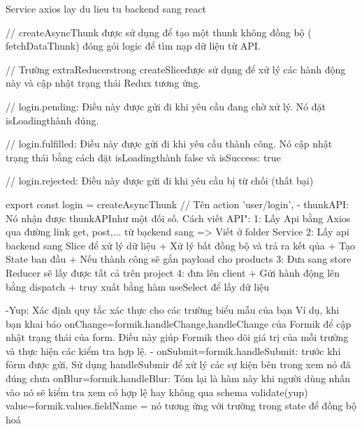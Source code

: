 Service axios lay du lieu tu backend sang react

// createAsyncThunk được sử dụng để tạo một thunk không đồng bộ ( fetchDataThunk) đóng gói logic để tìm nạp dữ liệu từ API.

// Trường extraReducerstrong createSliceđược sử dụng để xử lý các hành động này và cập nhật trạng thái Redux tương ứng.

// login.pending: Điều này được gửi đi khi yêu cầu  đang chờ xử lý. Nó đặt isLoadingthành đúng.

// login.fulfilled: Điều này được gửi đi khi yêu cầu thành công. Nó cập nhật trạng thái bằng cách đặt isLoadingthành false và isSuccess: true

// login.rejected: Điều này được gửi đi khi yêu cầu bị từ chối (thất bại)

export const login = createAsyncThunk
  // Tên action
  'user/login',
  - thunkAPI: Nó nhận được thunkAPInhư một đối số.
Cách viết API":
1: Lấy Api bằng Axios qua đường link get, post,... từ bạckend sang => Viết ở folder Service
2: Lấy api backend sang Slice để xử lý dữ liệu 
+ Xử lý bất đồng bộ và trả ra kết qủa
+ Tạo State ban đầu
+ Nếu thành công sẽ gắn payload cho products
3: Đưa sang store Reducer sẽ lấy được tất cả trên project
4: đưa lên client 
+ Gửi hành động lên bằng dispatch
+ truy xuất bằng hàm useSelect để lấy dữ liệu 

-Yup: Xác định quy tắc xác thực cho các trường biểu mẫu của bạn
Ví dụ, khi bạn khai báo onChange={formik.handleChange},handleChange của Formik để cập nhật trạng thái của form. 
Điều này giúp Formik theo dõi giá trị của mỗi trường và thực hiện các kiểm tra hợp lệ.
- onSubmit={formik.handleSubmit}: trước khi fỏrm được gửi, Sử dụng handleSubmir để xử lý các sự kiện bên trong xem nó đã đúng chưa
onBlur={formik.handleBlur}: Tóm lại là hàm này khi người dùng nhấn vào nó sẽ kiểm tra xem có hợp lệ hay không qua schema validate(yup)
value={formik.values.fieldName} = nó tương ứng với trường trong state để đồng bộ hoá
